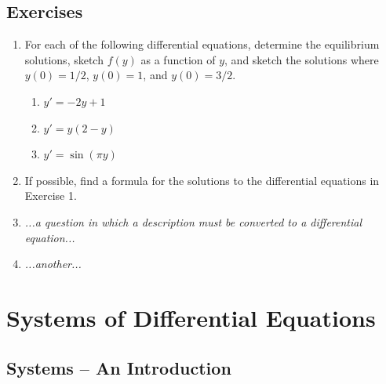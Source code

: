 \documentclass{book}
\newcommand{\ds}{\displaystyle}
\begin{document}
\subsection{Exercises}
\begin{enumerate}
\item For each of the following differential equations,
determine the equilibrium solutions, sketch $f(y)$ as a function
of $y$, and sketch the solutions where $y(0)=1/2$, $y(0)=1$, and
$y(0)=3/2$.
\begin{enumerate}
\item $\ds y' = -2y + 1$
\item $\ds y' = y(2-y)$
\item $\ds y' = \sin(\pi y)$
\end{enumerate}
\item
If possible, find a formula for the solutions to the
differential equations in Exercise 1.
\item
\emph{...a question in which a description must be converted to
a differential equation...}
\item
\emph{...another...}
\end{enumerate}

\section{Systems of Differential Equations}
\subsection{Systems -- An Introduction}
\end{document}

